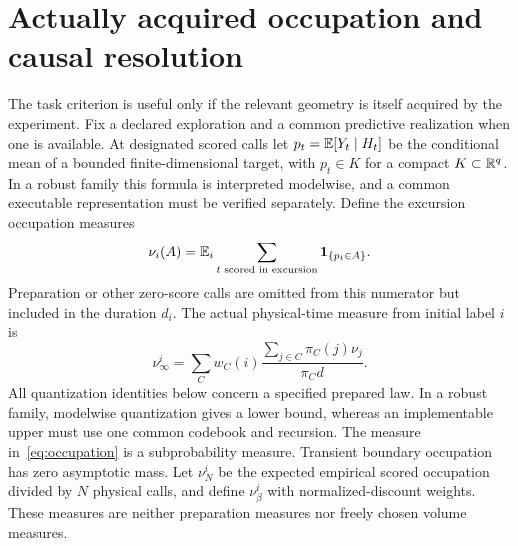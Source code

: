 \section{Actually acquired occupation and causal resolution}\label{sec:geometry}
The task criterion is useful only if the relevant geometry is itself acquired by the experiment. Fix a declared exploration and a common predictive realization when one is available. At designated scored calls let $p_t=\mathbb E[Y_t\mid H_t]$ be the conditional mean of a bounded finite-dimensional target, with $p_t\in K$ for a compact $K\subset\mathbb R^q$. In a robust family this formula is interpreted modelwise, and a common executable representation must be verified separately. Define the excursion occupation measures
\[
 \nu_i(A)=\mathbb E_i\sum_{t\text{ scored in excursion}}\mathbf 1_{\{p_t\in A\}}.
\]
Preparation or other zero-score calls are omitted from this numerator but included in the duration $d_i$. The actual physical-time measure from initial label $i$ is
\begin{equation}\label{eq:occupation}
 \nu_\infty^i=\sum_C w_C(i)\frac{\sum_{j\in C}\pi_C(j)\nu_j}{\pi_Cd}.
\end{equation}
All quantization identities below concern a specified prepared law. In a robust family, modelwise quantization gives a lower bound, whereas an implementable upper must use one common codebook and recursion. The measure in~\eqref{eq:occupation} is a subprobability measure. Transient boundary occupation has zero asymptotic mass. Let $\nu_N^i$ be the expected empirical scored occupation divided by $N$ physical calls, and define $\nu_\beta^i$ with normalized-discount weights. These measures are neither preparation measures nor freely chosen volume measures.

